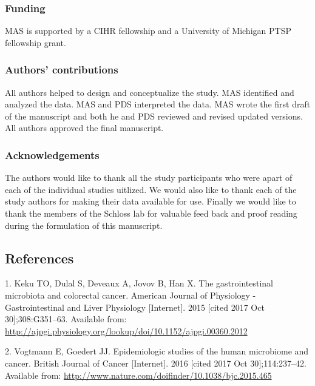 \documentclass[12pt,]{article}
\begin{document}
\subsubsection{Funding}\label{funding}

MAS is supported by a CIHR fellowship and a University of Michigan PTSP
fellowship grant.

\subsubsection{Authors' contributions}\label{authors-contributions}

All authors helped to design and conceptualize the study. MAS identified
and analyzed the data. MAS and PDS interpreted the data. MAS wrote the
first draft of the manuscript and both he and PDS reviewed and revised
updated versions. All authors approved the final manuscript.

\subsubsection{Acknowledgements}\label{acknowledgements}

The authors would like to thank all the study participants who were
apart of each of the individual studies uitlized. We would also like to
thank each of the study authors for making their data available for use.
Finally we would like to thank the members of the Schloss lab for
valuable feed back and proof reading during the formulation of this
manuscript.

\newpage

\subsection{References}\label{references}

\hypertarget{refs}{}
\hypertarget{ref-keku_gastrointestinal_2015}{}
1. Keku TO, Dulal S, Deveaux A, Jovov B, Han X. The gastrointestinal
microbiota and colorectal cancer. American Journal of Physiology -
Gastrointestinal and Liver Physiology {[}Internet{]}. 2015 {[}cited 2017
Oct 30{]};308:G351--63. Available from:
\url{http://ajpgi.physiology.org/lookup/doi/10.1152/ajpgi.00360.2012}

\hypertarget{ref-vogtmann_epidemiologic_2016}{}
2. Vogtmann E, Goedert JJ. Epidemiologic studies of the human microbiome
and cancer. British Journal of Cancer {[}Internet{]}. 2016 {[}cited 2017
Oct 30{]};114:237--42. Available from:
\url{http://www.nature.com/doifinder/10.1038/bjc.2015.465}
\end{document}
